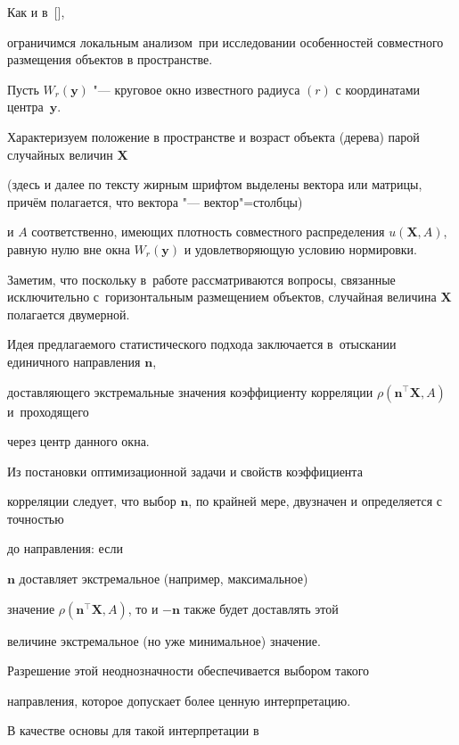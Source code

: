  Как и в~[],

ограничимся локальным анализом~при исследовании особенностей совместного размещения объектов в прост\-ранстве.



Пусть  $W_r(\mathbf{y})$ "--- круговое окно известного радиуса $(r)$ с координатами центра~$\mathbf{y}$. 

Характеризуем положение в пространстве и возраст объекта (дерева) парой случайных величин $\mathbf{X}$ 

(здесь и далее по тексту жирным шрифтом выделены вектора или матрицы, причём полагается, что вектора "--- вектор"=столбцы) 

и $A$ соответственно, имеющих плотность совместного распределения $u(\mathbf{X}, A)$, равную нулю вне окна $W_r(\mathbf{y})$ и удовлетворяющую условию нормировки.  

Заметим, что поскольку  в~работе рассматриваются вопросы, связанные исключительно с~горизонтальным размещением объектов, случайная величина  $\mathbf{X}$ полагается двумерной.



Идея предлагаемого статистического подхода заключается в~отыскании единичного направления $\mathbf{n}$, 

доставляющего экстремальные  значения коэффициенту корреляции $\rho(\mathbf{n}^\top \mathbf{X},A)$ и~проходящего 

через центр данного окна. 



Из постановки оптимизационной задачи и свойств коэффициента 

корреляции следует, что  выбор $\mathbf{n}$, по крайней мере, двузначен и определяется с точностью 

до направления: если 

$\mathbf{n}$ доставляет экстремальное (например, максимальное) 

значение $\rho(\mathbf{n}^\top \mathbf{X},A)$, то и $-\mathbf{n}$ также будет доставлять этой 

величине экстремальное (но уже минимальное) значение. 

Разрешение этой неоднозначности обеспечивается выбором такого 

направления, которое допускает более ценную интерпретацию. 



В качестве основы для такой интерпретации в  

